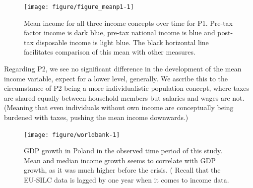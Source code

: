 \documentclass[a4paper]{article}\usepackage[]{graphicx}\usepackage[]{color}
\newenvironment{knitrout}{}{} %
\begin{document}
\begin{knitrout}
\color{fgcolor}\begin{figure}

{\centering \texttt{[image: figure/figure\_meanp1-1]} 

}

\caption[Mean income for all three income concepts over time for P1]{Mean income for all three income concepts over time for P1. Pre-tax factor income is dark blue, pre-tax national income is blue and post-tax disposable income is light blue. The black horizontal line facilitates comparison of this mean with other measures.}\label{fig:figure_meanp1}
\end{figure}


\end{knitrout}
Regarding P2, we see no significant difference in the development of the mean income variable, expect for a lower level, generally. We ascribe this to the circumstance of P2 being a more individualistic population concept, where taxes are shared equally between household members but salaries and wages are not. (Meaning that even individuals without own income are conceptually being burdened with taxes, pushing the mean income downwards.) 
\begin{knitrout}
\color{fgcolor}\begin{figure}

{\centering \texttt{[image: figure/worldbank-1]} 

}

\caption[GDP growth in Poland in the observed time period of this study]{GDP growth in Poland in the observed time period of this study. Mean and median income growth seems to correlate with GDP growth, as it was much higher before the crisis. ( Recall that the EU-SILC data is lagged by one year when it comes to income data.}\label{fig:worldbank}
\end{figure}


\end{knitrout}
\end{document}
